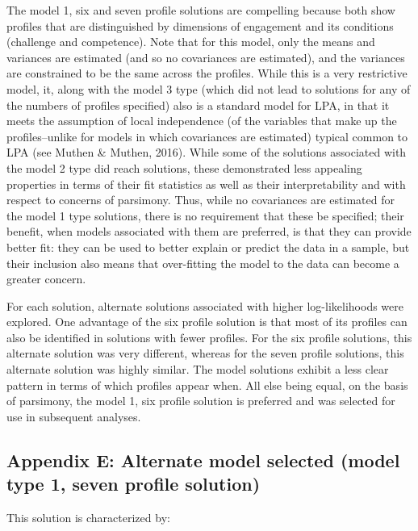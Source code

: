 \documentclass[]{msu-thesis}
\theoremstyle{definition}
\theoremstyle{definition}
\theoremstyle{definition}
\theoremstyle{remark}
\begin{document}
The model 1, six and seven profile solutions are compelling because both
show profiles that are distinguished by dimensions of engagement and its
conditions (challenge and competence). Note that for this model, only
the means and variances are estimated (and so no covariances are
estimated), and the variances are constrained to be the same across the
profiles. While this is a very restrictive model, it, along with the
model 3 type (which did not lead to solutions for any of the numbers of
profiles specified) also is a standard model for LPA, in that it meets
the assumption of local independence (of the variables that make up the
profiles--unlike for models in which covariances are estimated) typical
common to LPA (see Muthen \& Muthen, 2016). While some of the solutions
associated with the model 2 type did reach solutions, these demonstrated
less appealing properties in terms of their fit statistics as well as
their interpretability and with respect to concerns of parsimony. Thus,
while no covariances are estimated for the model 1 type solutions, there
is no requirement that these be specified; their benefit, when models
associated with them are preferred, is that they can provide better fit:
they can be used to better explain or predict the data in a sample, but
their inclusion also means that over-fitting the model to the data can
become a greater concern.

For each solution, alternate solutions associated with higher
log-likelihoods were explored. One advantage of the six profile solution
is that most of its profiles can also be identified in solutions with
fewer profiles. For the six profile solutions, this alternate solution
was very different, whereas for the seven profile solutions, this
alternate solution was highly similar. The model solutions exhibit a
less clear pattern in terms of which profiles appear when. All else
being equal, on the basis of parsimony, the model 1, six profile
solution is preferred and was selected for use in subsequent analyses.

\subsection{Appendix E: Alternate model selected (model type 1, seven
profile
solution)}\label{appendix-e-alternate-model-selected-model-type-1-seven-profile-solution}

This solution is characterized by:
\end{document}
